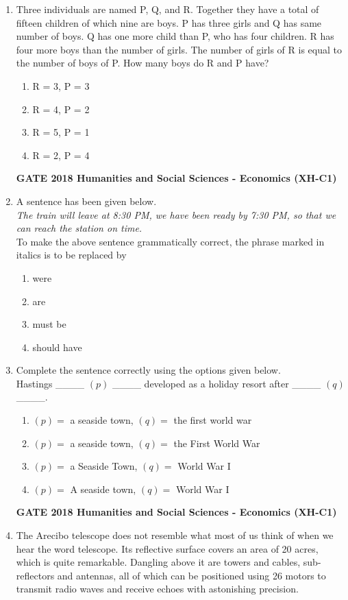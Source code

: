 \documentclass[journal,12pt,onecolumn]{exam}
\theoremstyle{remark}
\begin{document}
\begin{enumerate}
    \item Three individuals are named P, Q, and R. Together they have a total of fifteen children of which nine are boys. P has three girls and Q has same number of boys. Q has one more child than P, who has four children. R has four more boys than the number of girls. The number of girls of R is equal to the number of boys of P. How many boys do R and P have?

    \begin{enumerate}
        \item R = 3, P = 3
        \item R = 4, P = 2
        \item R = 5, P = 1
        \item R = 2, P = 4
    \end{enumerate}
    \textbf{GATE 2018 Humanities and Social Sciences - Economics (XH-C1)}
 \item A sentence has been given below.\\

    \textit{The train will leave at 8:30 PM, we have been ready by 7:30 PM, so that we can reach the station on time.}\\

    To make the above sentence grammatically correct, the phrase marked in italics is to be replaced by

    \begin{enumerate}
        \item were
        \item are
        \item must be
        \item should have
    \end{enumerate}
    \newpage
    \item Complete the sentence correctly using the options given below.\\

    Hastings \_\_\_\_ $(p)$ \_\_\_\_ developed as a holiday resort after \_\_\_\_ $(q)$ \_\_\_\_.\\

    \begin{enumerate}
        \item $(p) =$ a seaside town, \quad $(q) =$ the first world war
        \item $(p) =$ a seaside town, \quad $(q) =$ the First World War
        \item $(p) =$ a Seaside Town, \quad $(q) =$ World War I
        \item $(p) =$ A seaside town, \quad $(q) =$ World War I
    \end{enumerate}
\textbf{GATE 2018 Humanities and Social Sciences - Economics (XH-C1)}
\item The Arecibo telescope does not resemble what most of us think of when we hear
the word telescope. Its reflective surface covers an area of 20 acres, which is quite
remarkable. Dangling above it are towers and cables, sub-reflectors and antennas,
all of which can be positioned using 26 motors to transmit radio waves and receive
echoes with astonishing precision.


\end{enumerate}
\end{document}
